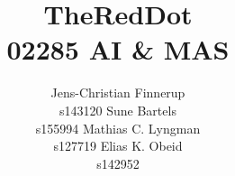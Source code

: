\documentclass[letterpaper]{article}
\begin{document}
\title{TheRedDot\\02285 AI \& MAS}
\author{
Jens-Christian Finnerup \\ s143120 \And 
Sune Bartels \\ s155994 \And 
Mathias C. Lyngman \\ s127719 \And 
Elias K. Obeid \\ s142952}

\maketitle










\end{document}
